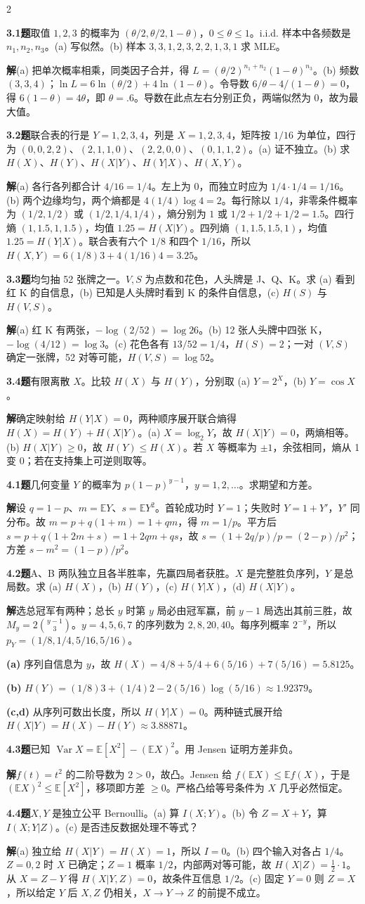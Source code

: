 \documentclass[a4paper]{article}
\newcommand{\cols}{2}
\newcommand{\cols}{4}
\newcommand{\topic}[1]{\par\addvspace{2.6pt}{\color{ink}\bfseries #1}\par\nobreak}
\newcommand{\problem}[2]{\par\addvspace{1.4pt}\textcolor{ink}{\textbf{#1}}\enspace\textbf{题}\enspace #2\par\nobreak}
\newcommand{\solve}{\noindent\textbf{解}\enspace}
\newcommand{\parta}[1]{\par\noindent\textbf{(#1)}\enspace}
\newcommand{\E}{\mathbb E}
\newcommand{\V}{\operatorname{Var}}
\begin{document}
\begin{multicols}{\cols}
\topic{Tut 3 · MLE 与熵}
\problem{3.1}{取值 $1,2,3$ 的概率为 $(\theta/2,\theta/2,1-\theta)$，$0\le\theta\le1$。i.i.d. 样本中各频数是 $n_1,n_2,n_3$。(a) 写似然。(b) 样本 $3,3,1,2,3,2,2,1,3,1$ 求 MLE。}
\solve (a) 把单次概率相乘，同类因子合并，得 $L=(\theta/2)^{n_1+n_2}(1-\theta)^{n_3}$。(b) 频数 $(3,3,4)$；$\ln L=6\ln(\theta/2)+4\ln(1-\theta)$。令导数 $6/\theta-4/(1-\theta)=0$，得 $6(1-\theta)=4\theta$，即 $\theta=.6$。导数在此点左右分别正负，两端似然为 0，故为最大值。
\problem{3.2}{联合表的行是 $Y=1,2,3,4$，列是 $X=1,2,3,4$，矩阵按 $1/16$ 为单位，四行为 $(0,0,2,2)$、$(2,1,1,0)$、$(2,2,0,0)$、$(0,1,1,2)$。(a) 证不独立。(b) 求 $H(X)$、$H(Y)$、$H(X|Y)$、$H(Y|X)$、$H(X,Y)$。}
\solve (a) 各行各列都合计 $4/16=1/4$。左上为 0，而独立时应为 $1/4\cdot1/4=1/16$。(b) 两个边缘均匀，两个熵都是 $4(1/4)\log 4=2$。每行除以 $1/4$，非零条件概率为 $(1/2,1/2)$ 或 $(1/2,1/4,1/4)$，熵分别为 $1$ 或 $1/2+1/2+1/2=1.5$。四行熵 $(1,1.5,1,1.5)$，均值 $1.25=H(X|Y)$。四列熵 $(1,1.5,1.5,1)$，均值 $1.25=H(Y|X)$。联合表有六个 $1/8$ 和四个 $1/16$，所以 $H(X,Y)=6(1/8)3+4(1/16)4=3.25$。
\problem{3.3}{均匀抽 52 张牌之一。$V,S$ 为点数和花色，人头牌是 J、Q、K。求 (a) 看到红 K 的自信息，(b) 已知是人头牌时看到 K 的条件自信息，(c) $H(S)$ 与 $H(V,S)$。}
\solve (a) 红 K 有两张，$-\log(2/52)=\log26$。(b) 12 张人头牌中四张 K，$-\log(4/12)=\log3$。(c) 花色各有 $13/52=1/4$，$H(S)=2$；一对 $(V,S)$ 确定一张牌，52 对等可能，$H(V,S)=\log52$。
\problem{3.4}{有限离散 $X$。比较 $H(X)$ 与 $H(Y)$，分别取 (a) $Y=2^X$，(b) $Y=\cos X$。}
\solve 确定映射给 $H(Y|X)=0$，两种顺序展开联合熵得 $H(X)=H(Y)+H(X|Y)$。(a) $X=\log_2Y$，故 $H(X|Y)=0$，两熵相等。(b) $H(X|Y)\ge0$，故 $H(Y)\le H(X)$。若 $X$ 等概率为 $\pm1$，余弦相同，熵从 1 变 0；若在支持集上可逆则取等。

\topic{Tut 4 · 熵、Jensen、互信息}
\problem{4.1}{几何变量 $Y$ 的概率为 $p(1-p)^{y-1}$，$y=1,2,\dots$。求期望和方差。}
\solve 设 $q=1-p$、$m=\E Y$、$s=\E Y^2$。首轮成功时 $Y=1$；失败时 $Y=1+Y'$，$Y'$ 同分布。故 $m=p+q(1+m)=1+qm$，得 $m=1/p$。平方后 $s=p+q(1+2m+s)=1+2qm+qs$，故 $s=(1+2q/p)/p=(2-p)/p^2$；方差 $s-m^2=(1-p)/p^2$。
\problem{4.2}{A、B 两队独立且各半胜率，先赢四局者获胜。$X$ 是完整胜负序列，$Y$ 是总局数。求 (a) $H(X)$，(b) $H(Y)$，(c) $H(Y|X)$，(d) $H(X|Y)$。}
\solve 选总冠军有两种；总长 $y$ 时第 $y$ 局必由冠军赢，前 $y-1$ 局选出其前三胜，故 $M_y=2\binom{y-1}3$。$y=4,5,6,7$ 的序列数为 $2,8,20,40$。每序列概率 $2^{-y}$，所以 $p_Y=(1/8,1/4,5/16,5/16)$。
\parta{a} 序列自信息为 $y$，故 $H(X)=4/8+5/4+6(5/16)+7(5/16)=5.8125$。
\parta{b} $H(Y)=(1/8)3+(1/4)2-2(5/16)\log(5/16)\approx1.92379$。
\parta{c,d} 从序列可数出长度，所以 $H(Y|X)=0$。两种链式展开给 $H(X|Y)=H(X)-H(Y)\approx3.88871$。
\problem{4.3}{已知 $\V X=\E[X^2]-(\E X)^2$。用 Jensen 证明方差非负。}
\solve $f(t)=t^2$ 的二阶导数为 $2>0$，故凸。Jensen 给 $f(\E X)\le\E f(X)$，于是 $(\E X)^2\le\E[X^2]$，移项即方差 $\ge0$。严格凸给等号条件为 $X$ 几乎必然恒定。
\problem{4.4}{$X,Y$ 是独立公平 Bernoulli。(a) 算 $I(X;Y)$。(b) 令 $Z=X+Y$，算 $I(X;Y|Z)$。(c) 是否违反数据处理不等式？}
\solve (a) 独立给 $H(X|Y)=H(X)=1$，所以 $I=0$。(b) 四个输入对各占 $1/4$。$Z=0,2$ 时 $X$ 已确定；$Z=1$ 概率 $1/2$，内部两对等可能，故 $H(X|Z)=\tfrac12\cdot1$。从 $X=Z-Y$ 得 $H(X|Y,Z)=0$，故条件互信息 $1/2$。(c) 固定 $Y=0$ 则 $Z=X$，所以给定 $Y$ 后 $X,Z$ 仍相关，$X\to Y\to Z$ 的前提不成立。


\end{multicols}
\end{document}
